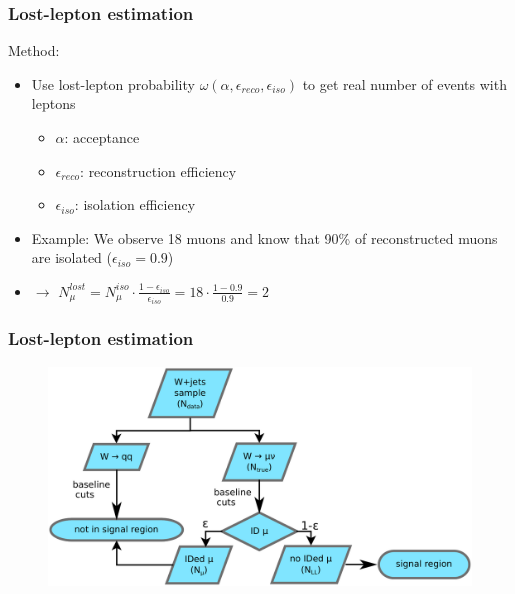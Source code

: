 \begin{frame}
  \frametitle{Lost-lepton estimation}
  \begin{block}{Method:}
  \begin{itemize}
    \item Use lost-lepton probability $\omega(\alpha, \epsilon_{reco}, \epsilon_{iso})$ to get real number of events with leptons 
    \begin{itemize}
      \item $\alpha$: acceptance
      \item $\epsilon_{reco}$: reconstruction efficiency
      \item $\epsilon_{iso}$: isolation efficiency
    \end{itemize}
    \item Example: We observe 18 muons and know that 90\% of reconstructed muons are isolated ($\epsilon_{iso} = 0.9$)
    \item $\rightarrow$ $N_\mu^{lost} = N_\mu^{iso} \cdot \frac{1 - \epsilon_{iso}}{\epsilon_{iso}} = 18 \cdot \frac{1 - 0.9}{0.9} = 2$
  \end{itemize}
  \end{block}
\end{frame}

\begin{frame}
  \frametitle{Lost-lepton estimation}
  \begin{figure}[H]
    \centering
    \includegraphics[width=1\textwidth,height=0.8\textheight,keepaspectratio]{figures/lost-lepton-flow}
  \end{figure}
\end{frame}

